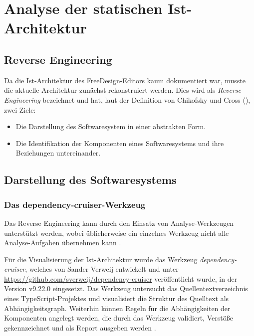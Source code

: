 \section{Analyse der statischen Ist-Architektur}
\subsection{Reverse Engineering}
Da die Ist-Architektur des FreeDesign-Editors kaum dokumentiert war, musste die aktuelle Architektur zunächst rekonstruiert werden. 
Dies wird als \emph{Reverse Engineering} bezeichnet und hat, laut der Definition von Chikofsky und Cross (\citeyear[S. 13-17]{Chikofsky1990}), zwei Ziele: 
\begin{itemize}
    \item Die Darstellung des Softwaresystem in einer abstrakten Form. 
    \item Die Identifikation der Komponenten eines Softwaresystems und ihre Beziehungen untereinander. 
\end{itemize}


\subsection{Darstellung des Softwaresystems}
\subsubsection{Das {dependency-cruiser}-Werkzeug}
Das Reverse Engineering kann durch den Einsatz von Analyse-Werkzeugen unterstützt werden, wobei üblicherweise ein einzelnes Werkzeug nicht alle Analyse-Aufgaben übernehmen kann  \autocite[vgl.][381]{Bass2013}.  

Für die Visualisierung der Ist-Architektur wurde das Werkzeug \emph{dependency-cruiser}, welches von Sander Verweij entwickelt und unter \url{https://github.com/sverweij/dependency-cruiser} veröffentlicht wurde, in der Version v9.22.0 eingesetzt. 
Das Werkzeug untersucht das Quellentextverzeichnis eines TypeScript-Projektes und visualisiert die Struktur des Quelltext als Abhängigkeitsgraph. Weiterhin können Regeln für die Abhängigkeiten der Komponenten angelegt werden, die durch das Werkzeug validiert, Verstöße gekennzeichnet und als Report ausgeben werden \autocite[vgl.][]{Verweij:Dependency}. 

